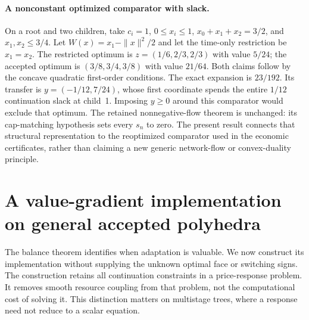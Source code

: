 \documentclass[11pt,letterpaper]{article}
\theoremstyle{definition}
\newcommand{\1}{\mathbf 1}
\begin{document}
\paragraph{A nonconstant optimized comparator with slack.}
On a root and two children, take $c_i=1$, $0\leq x_i\leq1$,
$x_0+x_1+x_2=3/2$, and $x_1,x_2\leq3/4$.
Let $W(x)=x_1-\|x\|^2/2$ and let the time-only restriction be $x_1=x_2$.
The restricted optimum is $z=(1/6,2/3,2/3)$ with value $5/24$;
the accepted optimum is $(3/8,3/4,3/8)$ with value $21/64$.
Both claims follow by the concave quadratic first-order conditions.
The exact expansion is $23/192$. Its transfer is
$y=(-1/12,7/24)$, whose first coordinate spends the entire $1/12$
continuation slack at child~1. Imposing $y\geq0$ around this comparator would
exclude that optimum. The retained nonnegative-flow theorem is unchanged:
its cap-matching hypothesis sets every $s_n$ to zero. The present result
connects that structural representation to the reoptimized comparator used
in the economic certificates, rather than claiming a new generic network-flow
or convex-duality principle.

\section{A value-gradient implementation on general accepted polyhedra}\label{sec:r19-bridge}
The balance theorem identifies when adaptation is valuable. We now construct its implementation without supplying the unknown optimal face or switching signs. The construction retains all continuation constraints in a price-response problem. It removes smooth resource coupling from that problem, not the computational cost of solving it. This distinction matters on multistage trees, where a response need not reduce to a scalar equation.
\end{document}
